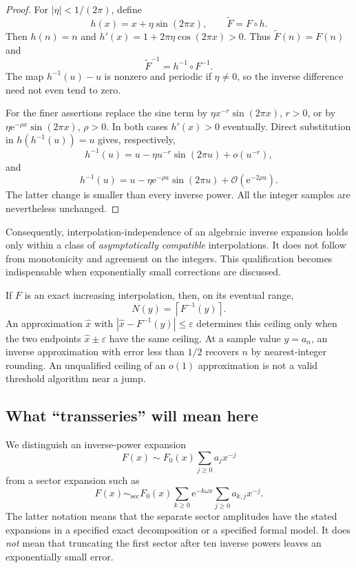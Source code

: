 \documentclass[11pt,a4paper]{article}
\numberwithin{equation}{section}
\theoremstyle{definition}
\theoremstyle{remark}
\newcommand{\ee}{\mathrm e}
\newcommand{\bigO}{\mathcal O}
\newcommand{\sectorsim}{\mathrel{\sim_{\mathrm{sec}}}}
\begin{document}
\begin{proof}
For $|\eta|<1/(2\pi)$, define
\[
 h(x)=x+\eta\sin(2\pi x),\qquad \widetilde F=F\circ h.
\]
Then $h(n)=n$ and $h'(x)=1+2\pi\eta\cos(2\pi x)>0$. Thus $\widetilde F(n)=F(n)$ and
\[
 \widetilde F^{-1}=h^{-1}\circ F^{-1}.
\]
The map $h^{-1}(u)-u$ is nonzero and periodic if $\eta\ne0$, so the inverse difference need not even tend to zero.

For the finer assertions replace the sine term by $\eta x^{-r}\sin(2\pi x)$, $r>0$, or by $\eta\ee^{-\rho x}\sin(2\pi x)$, $\rho>0$. In both cases $h'(x)>0$ eventually. Direct substitution in $h(h^{-1}(u))=u$ gives, respectively,
\[
 h^{-1}(u)=u-\eta u^{-r}\sin(2\pi u)+o(u^{-r}),
\]
and
\[
 h^{-1}(u)=u-\eta\ee^{-\rho u}\sin(2\pi u)
           +\bigO(\ee^{-2\rho u}).
\]
The latter change is smaller than every inverse power. All the integer samples are nevertheless unchanged.
\end{proof}

Consequently, interpolation-independence of an algebraic inverse expansion holds only within a class of \emph{asymptotically compatible} interpolations. It does not follow from monotonicity and agreement on the integers. This qualification becomes indispensable when exponentially small corrections are discussed.

If $F$ is an exact increasing interpolation, then, on its eventual range,
\begin{equation}
 N(y)=\left\lceil F^{-1}(y)\right\rceil.
 \label{eq:ceil}
\end{equation}
An approximation $\widehat x$ with $|\widehat x-F^{-1}(y)|\le\varepsilon$ determines this ceiling only when the two endpoints $\widehat x\pm\varepsilon$ have the same ceiling. At a sample value $y=a_n$, an inverse approximation with error less than $1/2$ recovers $n$ by nearest-integer rounding. An unqualified ceiling of an $o(1)$ approximation is not a valid threshold algorithm near a jump.

\subsection{What ``transseries'' will mean here}

We distinguish an inverse-power expansion
\[
 F(x)\sim F_0(x)\sum_{j\ge0}a_jx^{-j}
\]
from a sector expansion such as
\[
 F(x)\sectorsim F_0(x)\sum_{k\ge0}\ee^{-k\omega x}
       \sum_{j\ge0}a_{k,j}x^{-j}.
\]
The latter notation means that the separate sector amplitudes have the stated expansions in a specified exact decomposition or a specified formal model. It does \emph{not} mean that truncating the first sector after ten inverse powers leaves an exponentially small error.
\end{document}
